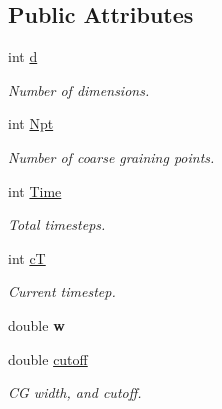 \subsection*{Public Attributes}
\begin{DoxyCompactItemize}
\item 
\mbox{\label{classCoarsing_a88086b32fb8eb340560c00ad3f132937}} 
int \hyperlink{classCoarsing_a88086b32fb8eb340560c00ad3f132937}{d}
\begin{DoxyCompactList}\small\item\em Number of dimensions. \end{DoxyCompactList}\item 
\mbox{\label{classCoarsing_a0f4ae1846092ee42c3cc0b55cec85ed1}} 
int \hyperlink{classCoarsing_a0f4ae1846092ee42c3cc0b55cec85ed1}{Npt}
\begin{DoxyCompactList}\small\item\em Number of coarse graining points. \end{DoxyCompactList}\item 
\mbox{\label{classCoarsing_a49f5477a50665dabd7c8d6ee05fbfb89}} 
int \hyperlink{classCoarsing_a49f5477a50665dabd7c8d6ee05fbfb89}{Time}
\begin{DoxyCompactList}\small\item\em Total timesteps. \end{DoxyCompactList}\item 
\mbox{\label{classCoarsing_a820ee3cdc5a2f3a10fdfb295abd72f9a}} 
int \hyperlink{classCoarsing_a820ee3cdc5a2f3a10fdfb295abd72f9a}{cT}
\begin{DoxyCompactList}\small\item\em Current timestep. \end{DoxyCompactList}\item 
\mbox{\label{classCoarsing_a4f64442e557dfbff555f0d8a5e2c7ffa}} 
double {\bfseries w}
\item 
\mbox{\label{classCoarsing_a1cc37fdd5e18d1a53c4d3e60be2b3c43}} 
double \hyperlink{classCoarsing_a1cc37fdd5e18d1a53c4d3e60be2b3c43}{cutoff}
\begin{DoxyCompactList}\small\item\em CG width, and cutoff. \end{DoxyCompactList}\item 

\end{DoxyCompactItemize}
